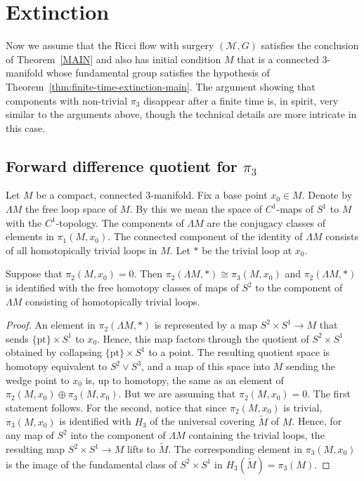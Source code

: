 \section{Extinction}

Now we assume that the Ricci flow with surgery $({\mathcal M},G)$ satisfies the
conclusion of Theorem~\ref{MAIN} and also has initial condition $M$ that is a
connected $3$-manifold whose fundamental group satisfies the hypothesis of
Theorem~\ref{thm:finite-time-extinction-main}. The argument showing that  components with non-trivial
$\pi_3$ disappear after a finite time is, in spirit, very similar to the
arguments above, though the technical details are more intricate in this case.

\subsection{Forward difference quotient for $\pi_3$}

Let $M$ be a compact, connected $3$-manifold. Fix a base point
$x_0\in M$. Denote by $\Lambda M$ the free loop space of $M$. By
this we mean the space of $C^1$-maps of $S^1$ to $M$ with the
$C^1$-topology. The components of $\Lambda M$ are the conjugacy
classes of elements in $\pi_1(M,x_0)$. The connected component of
the identity of $\Lambda M$ consists of all homotopically trivial
loops in $M$. Let $*$ be the trivial loop at $x_0$.

\begin{claim}
\label{claim:loop-space-pi2-pi3-iso}
Suppose that $\pi_2(M,x_0)=0$. Then $\pi_2(\Lambda M,*)\cong
\pi_3(M,x_0)$ and $\pi_2(\Lambda M,*)$ is identified with the free
homotopy classes of maps of $S^2$ to the component of $\Lambda M$
consisting of homotopically trivial loops.
\end{claim}


\begin{proof}
An element in $\pi_2(\Lambda M,*)$ is represented by a map
$S^2\times S^1\to M$ that sends $\{\mathrm{pt}\}\times S^1$ to $x_0$.
Hence, this map factors through the quotient of $S^2\times S^1$
obtained by collapsing $\{\mathrm{pt}\}\times S^1$ to a point. The
resulting quotient space is homotopy equivalent to $S^2\vee S^3$,
and a map of this space into $M$ sending the wedge point to $x_0$
is, up to homotopy, the same as an element of $\pi_2(M,x_0)\oplus
\pi_3(M,x_0)$. But we are assuming that $\pi_2(M,x_0)=0$. The first
statement follows. For the second, notice that since $\pi_2(M,x_0)$
is trivial, $\pi_3(M,x_0)$ is identified with $H_3$ of the universal
covering $\widetilde M$ of $M$.  Hence, for any map of $S^2$ into
the component of $\Lambda M$ containing the trivial loops, the
resulting map $S^2\times S^1\to M$ lifts to  $\widetilde M$. The
corresponding element in $\pi_3(M,x_0)$ is the image of the
fundamental class of $S^2\times S^1$ in $H_3(\widetilde
M)=\pi_3(M)$.
\end{proof}


